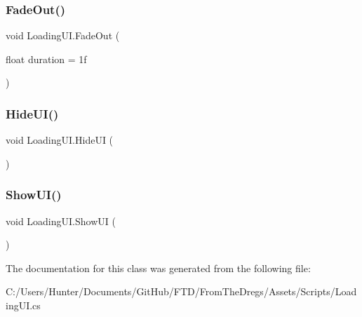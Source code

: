 \subsubsection{\texorpdfstring{FadeOut()}{FadeOut()}}
{\footnotesize\ttfamily void Loading\+U\+I.\+Fade\+Out (\begin{DoxyParamCaption}\item[{float}]{duration = {\ttfamily 1f} }\end{DoxyParamCaption})}

\mbox{\label{class_loading_u_i_a4b195dd7d9b45cbe16506f67e2d8bf10}} 
\subsubsection{\texorpdfstring{HideUI()}{HideUI()}}
{\footnotesize\ttfamily void Loading\+U\+I.\+Hide\+UI (\begin{DoxyParamCaption}{ }\end{DoxyParamCaption})}

\mbox{\label{class_loading_u_i_a117b66becd8ec50738d5bb53395c5638}} 
\subsubsection{\texorpdfstring{ShowUI()}{ShowUI()}}
{\footnotesize\ttfamily void Loading\+U\+I.\+Show\+UI (\begin{DoxyParamCaption}{ }\end{DoxyParamCaption})}



The documentation for this class was generated from the following file\+:\begin{DoxyCompactItemize}
\item 
C\+:/\+Users/\+Hunter/\+Documents/\+Git\+Hub/\+F\+T\+D/\+From\+The\+Dregs/\+Assets/\+Scripts/Loading\+U\+I.\+cs\end{DoxyCompactItemize}
